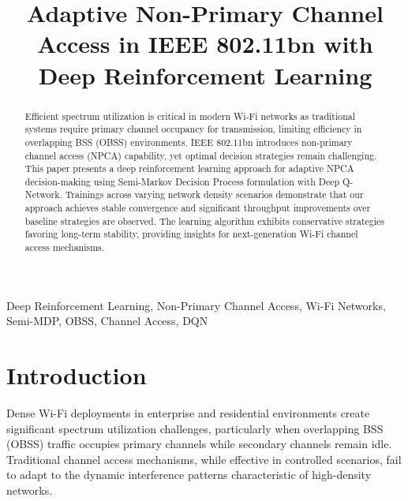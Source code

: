 \documentclass[conference]{IEEEtran}
\begin{document}
\title{Adaptive Non-Primary Channel Access in IEEE 802.11bn with Deep Reinforcement Learning}

\author{
}

\maketitle

\begin{abstract}
Efficient spectrum utilization is critical in modern Wi-Fi networks as traditional systems require primary channel occupancy for transmission, limiting efficiency in overlapping BSS (OBSS) environments. IEEE 802.11bn introduces non-primary channel access (NPCA) capability, yet optimal decision strategies remain challenging. This paper presents a deep reinforcement learning approach for adaptive NPCA decision-making using Semi-Markov Decision Process formulation with Deep Q-Network. Trainings across varying network density scenarios demonstrate that our approach achieves stable convergence and significant throughput improvements over baseline strategies are observed. The learning algorithm exhibits conservative strategies favoring long-term stability, providing insights for next-generation Wi-Fi channel access mechanisms.
\end{abstract}

\begin{IEEEkeywords}
Deep Reinforcement Learning, Non-Primary Channel Access, Wi-Fi Networks, Semi-MDP, OBSS, Channel Access, DQN
\end{IEEEkeywords}

\section{Introduction}

Dense Wi-Fi deployments in enterprise and residential environments create significant spectrum utilization challenges, particularly when overlapping BSS (OBSS) traffic occupies primary channels while secondary channels remain idle. Traditional channel access mechanisms, while effective in controlled scenarios, fail to adapt to the dynamic interference patterns characteristic of high-density networks.
\end{document}
